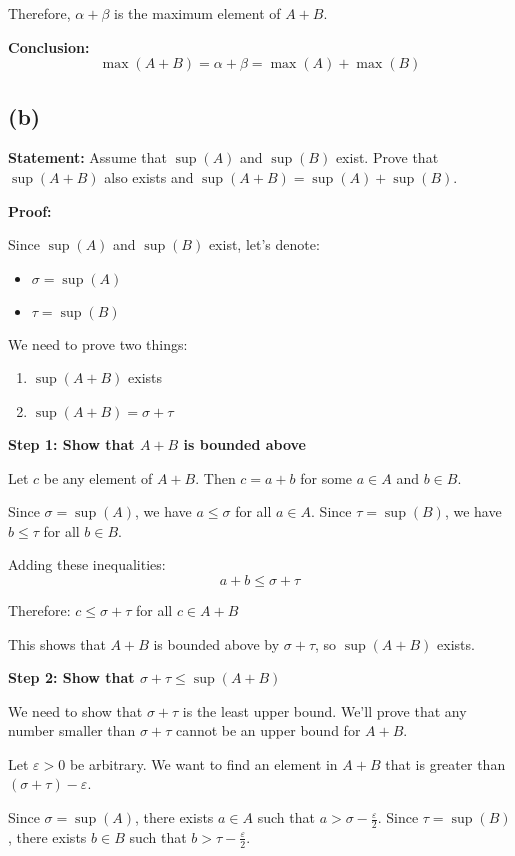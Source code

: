 \documentclass[12pt,a4paper]{article}
\theoremstyle{definition}
\theoremstyle{remark}
\begin{document}
Therefore, $\alpha + \beta$ is the maximum element of $A + B$.

\textbf{Conclusion:}
$$\max(A + B) = \alpha + \beta = \max(A) + \max(B)$$

\subsection*{(b)}

\textbf{Statement:} Assume that $\sup(A)$ and $\sup(B)$ exist. Prove that $\sup(A + B)$ also exists and $\sup(A + B) = \sup(A) + \sup(B)$.

\textbf{Proof:}

Since $\sup(A)$ and $\sup(B)$ exist, let's denote:
\begin{itemize}
\item $\sigma = \sup(A)$
\item $\tau = \sup(B)$
\end{itemize}

We need to prove two things:
\begin{enumerate}
\item $\sup(A + B)$ exists
\item $\sup(A + B) = \sigma + \tau$
\end{enumerate}

\textbf{Step 1: Show that $A + B$ is bounded above}

Let $c$ be any element of $A + B$. Then $c = a + b$ for some $a \in A$ and $b \in B$.

Since $\sigma = \sup(A)$, we have $a \leq \sigma$ for all $a \in A$.
Since $\tau = \sup(B)$, we have $b \leq \tau$ for all $b \in B$.

Adding these inequalities:
$$a + b \leq \sigma + \tau$$

Therefore: $c \leq \sigma + \tau$ for all $c \in A + B$

This shows that $A + B$ is bounded above by $\sigma + \tau$, so $\sup(A + B)$ exists.

\textbf{Step 2: Show that $\sigma + \tau \leq \sup(A + B)$}

We need to show that $\sigma + \tau$ is the least upper bound. We'll prove that any number smaller than $\sigma + \tau$ cannot be an upper bound for $A + B$.

Let $\varepsilon > 0$ be arbitrary. We want to find an element in $A + B$ that is greater than $(\sigma + \tau) - \varepsilon$.

Since $\sigma = \sup(A)$, there exists $a \in A$ such that $a > \sigma - \frac{\varepsilon}{2}$.
Since $\tau = \sup(B)$, there exists $b \in B$ such that $b > \tau - \frac{\varepsilon}{2}$.
\end{document}
